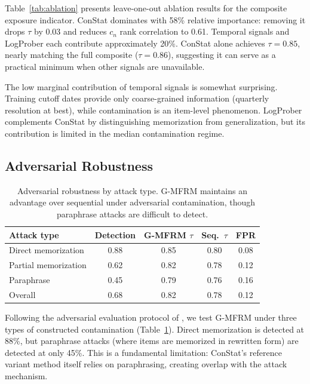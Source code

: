 \documentclass[11pt]{article}
\begin{document}
Table~\ref{tab:ablation} presents leave-one-out ablation results for the composite exposure indicator. ConStat dominates with 58\% relative importance: removing it drops $\tau$ by 0.03 and reduces $c_n$ rank correlation to 0.61. Temporal signals and LogProber each contribute approximately 20\%. ConStat alone achieves $\tau = 0.85$, nearly matching the full composite ($\tau = 0.86$), suggesting it can serve as a practical minimum when other signals are unavailable.

The low marginal contribution of temporal signals is somewhat surprising. Training cutoff dates provide only coarse-grained information (quarterly resolution at best), while contamination is an item-level phenomenon. LogProber complements ConStat by distinguishing memorization from generalization, but its contribution is limited in the median contamination regime.

\subsection{Adversarial Robustness}
\label{sec:adversarial}

\begin{table}[t]
\centering
\caption{Adversarial robustness by attack type. G-MFRM maintains an advantage over sequential under adversarial contamination, though paraphrase attacks are difficult to detect.}
\label{tab:adversarial}
\begin{tabular}{lcccc}
\toprule
Attack type & Detection & G-MFRM $\tau$ & Seq.\ $\tau$ & FPR \\
\midrule
Direct memorization & 0.88 & 0.85 & 0.80 & 0.08 \\
Partial memorization & 0.62 & 0.82 & 0.78 & 0.12 \\
Paraphrase & 0.45 & 0.79 & 0.76 & 0.16 \\
\midrule
Overall & 0.68 & 0.82 & 0.78 & 0.12 \\
\bottomrule
\end{tabular}
\end{table}

Following the adversarial evaluation protocol of \citet{wang2026adversarial}, we test G-MFRM under three types of constructed contamination (Table~\ref{tab:adversarial}). Direct memorization is detected at 88\%, but paraphrase attacks (where items are memorized in rewritten form) are detected at only 45\%. This is a fundamental limitation: ConStat's reference variant method itself relies on paraphrasing, creating overlap with the attack mechanism.
\end{document}

